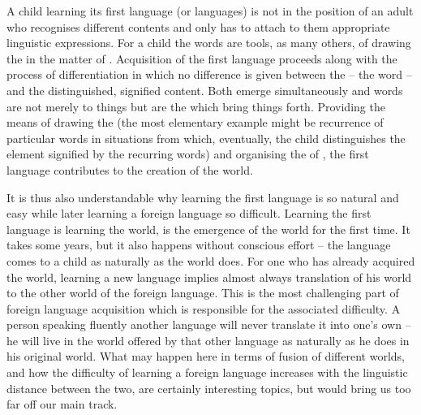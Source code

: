 A child learning its first language (or languages) is not in the position of an
adult who recognises different contents and only has to attach to them
appropriate linguistic expressions. For a child the words are tools, as many
others, of drawing the  in the matter of .
Acquisition of the first language proceeds along with the process of
differentiation in which no difference is given between the 
 -- the word -- and the distinguished, signified content. Both emerge
simultaneously and words are not merely  to things but are the
 which bring things forth.  Providing the means of drawing the
 (the most elementary example might be recurrence of particular
words in situations from which, eventually, the child distinguishes the element
signified by the recurring words) and organising the  of
, the first language contributes to the creation of the
world.

It is thus also understandable why learning the first language is so natural and
easy while later learning a foreign language so difficult.  Learning the first
language is learning the world, is the emergence of the world for the first
time. It takes some years, but it also happens without conscious effort -- the
language comes to a child as naturally as the world does.  For one who has
already acquired the world, learning a new language implies almost always
translation of his world to the other world of the foreign language. This is the
most challenging part of foreign language acquisition which is responsible for
the associated difficulty. A person speaking fluently another language will
never translate it into one's own -- he will live in the world offered by that
other language as naturally as he does in his original world. What may happen
here in terms of fusion of different worlds, and how the difficulty of learning
a foreign language increases with the linguistic distance between the two, are
certainly interesting topics, but would bring us too far off our main track.


